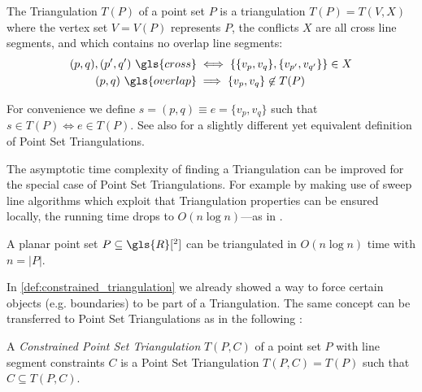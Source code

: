\begin{definition}
  \label{def:point_set_triangulation}
  The Triangulation \(T(P)\) of a point set \(P\)
  is a triangulation \(T(P) = T(V,X)\)
  where the vertex set \(V=V(P)\) represents \(P\), 
  the conflicts \(X\) are all \gls{cross} line segments, 
  and which contains no \gls{overlap} line segments:
  \begin{alignat*}{1}
    (p,q), (p',q')~\gls{cross}
    &\iff \left\{ \{v_p,v_q\}, \{v_{p'},v_{q'}\} \right\} \in X \\
     (p,q)~\gls{overlap}
    &\implies \{v_p,v_q\} \not\in T(P)
  \end{alignat*}

  For convenience we define \(s=(p,q) \equiv e=\{v_p,v_q\}\) such
  that \(s \in T(P) \iff e \in T(P)\). See also
  \cite[Section 9.1]{deberg_compgeom} for a slightly different yet
  equivalent definition of Point Set Triangulations.
\end{definition}

The asymptotic time complexity of finding a Triangulation can be 
improved for the special case of Point Set Triangulations. For example
by making use of sweep line algorithms which exploit that
Triangulation properties can be ensured locally, the running time
drops to \(O(n \log n)\)---as in \cite{fortunes_algorithm}.

\begin{theorem}
  \label{thm:time_complexity_planar_point_set_triangulations}
  A planar point set \(P \subseteq \gls{R}[^2]\) can be triangulated
  in \(O(n \log n)\) time with \(n = |P|\).
  \cite[Theorem 9.12]{deberg_compgeom}
\end{theorem}

In \cref{def:constrained_triangulation} we already showed a way to
force certain objects (e.g. boundaries) to be part of a Triangulation.
The same concept can be transferred to Point Set Triangulations as in
the following :

\begin{definition}
  \label{def:constrained_point_set_triangulation}
  A \emph{Constrained Point Set Triangulation} \(T(P,C)\)
  of a point set \(P\) with line segment constraints \(C\)
  is a Point Set Triangulation \(T(P,C) = T(P)\)
  such that \(C \subseteq T(P, C)\).
\end{definition}

